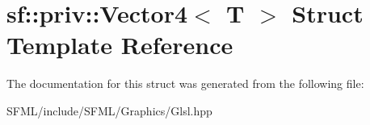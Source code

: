 \hypertarget{structsf_1_1priv_1_1_vector4}{}\section{sf\+:\+:priv\+:\+:Vector4$<$ T $>$ Struct Template Reference}
\label{structsf_1_1priv_1_1_vector4}


The documentation for this struct was generated from the following file\+:\begin{DoxyCompactItemize}
\item 
S\+F\+M\+L/include/\+S\+F\+M\+L/\+Graphics/Glsl.\+hpp\end{DoxyCompactItemize}
